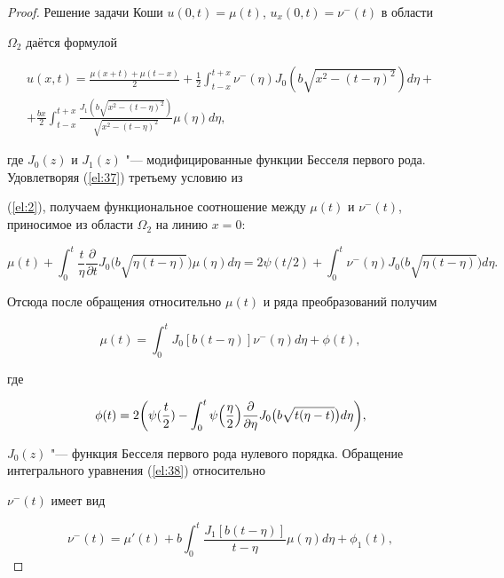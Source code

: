 \begin{proof}

Решение задачи Коши $u(0,t)=\mu(t)$, $u_x(0,t)=\nu^{-}(t)$ в области

$\Omega_2$ даётся формулой

\begin{multline} \label{el:37}

u(x,t)=\frac{\mu(x+t)+\mu(t-x)}{2}+\frac{1}{2}\int_{t-x}^{t+x}\nu^-(\eta)J_0(b\sqrt{x^2-(t-\eta)^2})d\eta+\\

+\frac{bx}{2}\int_{t-x}^{t+x}\frac{J_1(b\sqrt{x^2-(t-\eta)^2})}{\sqrt{x^2-(t-\eta)^2}}\mu(\eta)d\eta,

\end{multline}

где $J_0(z)$ и $J_1(z)$ "--- модифицированные функции Бесселя первого рода. Удовлетворяя (\ref{el:37}) третьему условию из 

(\ref{el:2}), получаем функциональное соотношение между $\mu(t)$ и $\nu^-(t)$, приносимое из области $\Omega_2$ на линию $x=0$:

$$

\mu(t)+\int_0^t\frac{t}{\eta}\frac{\partial}{\partial t}J_0\bigl(b\sqrt{\eta(t-\eta)}\bigr)\mu(\eta)d\eta=2\psi(t/2)+\int_0^t\nu^-(\eta)J_0\bigl(b\sqrt{\eta(t-\eta)}\bigr)d\eta.

$$



Отсюда после обращения относительно $\mu(t)$ и ряда преобразований получим \cite{eleevbalk:bib:Salah}

\begin{equation} \label{el:38}

\mu(t)=\int_0^tJ_0[b(t-\eta)]\nu^-(\eta)d\eta+\phi(t),

\end{equation}

где

$$\phi(t)=2\biggl(\psi(\frac{t}{2})-\int_0^t\psi\Bigl(\frac{\eta}{2}\Bigr)\frac{\partial}{\partial \eta}J_0\bigl(b\sqrt{t(\eta-t)}\bigr)d\eta\biggr),$$

$J_0(z)$ "--- функция Бесселя первого рода нулевого порядка. Обращение интегрального уравнения (\ref{el:38}) относительно 

$\nu^-(t)$ имеет вид

\begin{equation} \label{el:39}

\nu^-(t)=\mu'(t)+b\int_0^t\frac{J_1[b(t-\eta)]}{t-\eta}\mu(\eta)d\eta+\phi_1(t),


\end{equation}
\end{proof}

